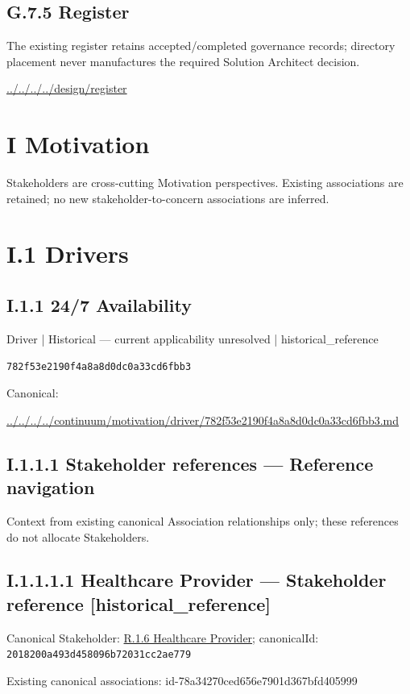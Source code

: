 \documentclass[10pt,a4paper]{article}
\begin{document}
\subsection*{G.7.5 Register}
The existing register retains accepted/completed governance records; directory placement never manufactures the required Solution Architect decision.\par
{\footnotesize\url{../../../../design/register}}\par
\section*{I Motivation}
Stakeholders are cross-cutting Motivation perspectives. Existing associations are retained; no new stakeholder-to-concern associations are inferred.\par
\section*{I.1 Drivers}
\subsection*{I.1.1 24/7 Availability}
\label{element-782f53e2190f4a8a8d0dc0a33cd6fbb3}
{\small Driver | Historical — current applicability unresolved | historical\_reference}\par
\texttt{782f53e2190f4a8a8d0dc0a33cd6fbb3}\par
Canonical: \par
{\footnotesize\url{../../../../continuum/motivation/driver/782f53e2190f4a8a8d0dc0a33cd6fbb3.md}}\par
\subsection*{I.1.1.1 Stakeholder references — Reference navigation}
Context from existing canonical Association relationships only; these references do not allocate Stakeholders.\par
\subsection*{I.1.1.1.1 Healthcare Provider — Stakeholder reference [historical\_reference]}
Canonical Stakeholder: \hyperref[element-2018200a493d458096b72031cc2ae779]{R.1.6 Healthcare Provider}; canonicalId: \texttt{2018200a493d458096b72031cc2ae779}\par
Existing canonical associations: id-78a34270ced656e7901d367bfd405999\par
\end{document}
